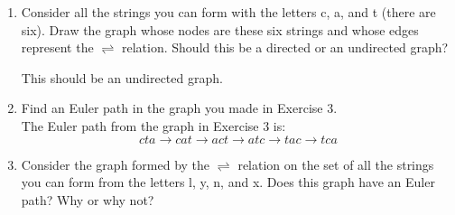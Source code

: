 \documentclass[12pt]{article}
\begin{document}
\begin{enumerate}
  \item Consider all the strings you can form with the letters c, a, and t (there are six). Draw the graph whose nodes are these six strings and whose edges represent the $\rightleftharpoons$ relation. Should this be a directed or an undirected graph?
  \begin{center}
  \end{center}
  This should be an undirected graph.
  \item Find an Euler path in the graph you made in Exercise 3.\\
  The Euler path from the graph in Exercise 3 is: 
  \[cta \rightarrow cat \rightarrow act \rightarrow atc \rightarrow tac \rightarrow tca\]
  \item Consider the graph formed by the $\rightleftharpoons$ relation on the set of all the strings you can form from the letters l, y, n, and x. Does this graph have an Euler path? Why or why not?
\end{enumerate}
\end{document}
